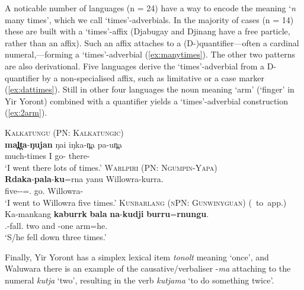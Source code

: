 \documentclass[12pt,egregdoesnotlikesansseriftitles]{scrartcl}
\begin{document}
A noticable number of languages (n = 24) have a way to encode the meaning `\textit{n} many times', which we call `times'-adverbials. In the majority of cases (n = 14) these are built with a `times'-affix (Djabugay and Djinang have a free particle, rather than an affix). Such an affix attaches to a (D-)quantifier---often a cardinal numeral,---forming a `times'-adverbial (\ref{ex:manytimes}). The other two patterns are also derivational. Five languages derive the `times'-adverbial from a D-quantifier by a non-specialised affix, such as limitative or a case marker (\ref{ex:dattimes}). Still in other four languages %
the noun meaning `arm' (`finger' in Yir Yoront) combined with a quantifier %
yields a `times'-adverbial construction (\ref{ex:2arm}).
\begin{exe}
  \ex\label{ex:manytimes} \textsc{Kalkatungu (PN: Kalkatungic)}\hfill {}\\
  \gll \textbf{mal̪t̪a}-\textbf{ŋujan} ŋai iŋka-n̪a pa-un̪a\\
  much-times I go-\Pst{} there-\All\\
  \glt `I went there lots of times.'
  \ex\label{ex:dattimes} \textsc{Warlpiri (PN: Ngumpin-Yapa)}\hfill {}\\
  \gll \textbf{Rdaka}-\textbf{pala}-\textbf{ku}=rna yanu Willowra-kurra.\\
  five-\Card-\Dat=\Fsg.\Sbj{} go.\Pst{} Willowra-\All\\
  \glt `I went to Willowra five times.'
  \ex\label{ex:2arm} \textsc{Kunbarlang (nPN: Gunwinyguan)} (\citealt{ikthesis}~to~app.)\\
  \gll Ka-mankang \textbf{kaburrk} \textbf{bala} \textbf{na}-\textbf{kudji} \textbf{burru}=\textbf{rnungu}.\\
  \Tsg.\Nfut-fall.\Pst{} two and \Cli-one arm=he.\Gen\\
  \glt `S/he fell down three times.' %
\end{exe}

Finally, Yir Yoront has a simplex lexical item \textit{tonolt} meaning `once', and Waluwara there is an example of the causative/verbaliser -\textit{\charis ma} attaching to the numeral \textit{\charis kutja} `two', resulting in the verb \textit{\charis kutjama} `to do something twice'. %
\end{document}
